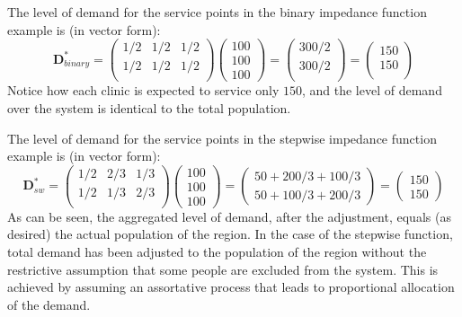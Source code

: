\documentclass[10pt,letterpaper]{article}
\begin{document}
The level of demand for the service points in the binary impedance
function example is (in vector form): \[
\mathbf{D}^*_{binary}= \left( \begin{array}{ccc}
1/2 & 1/2 & 1/2\\
1/2 & 1/2 & 1/2\\
\end{array} \right)
\left( \begin{array}{c}
100\\
100\\
100
\end{array} \right)=
\left( \begin{array}{c}
300/2\\
300/2\\
\end{array} \right)=
\left( \begin{array}{c}
150\\
150\\
\end{array} \right)
\] Notice how each clinic is expected to service only \(150\), and the
level of demand over the system is identical to the total population.

The level of demand for the service points in the stepwise impedance
function example is (in vector form): \[
\mathbf{D}^*_{sw}= \left( \begin{array}{ccc}
1/2 & 2/3 & 1/3\\
1/2 & 1/3 & 2/3\\
\end{array} \right)
\left( \begin{array}{c}
100\\
100\\
100
\end{array} \right)=
\left( \begin{array}{c}
50 + 200/3 + 100/3\\
50 + 100/3 + 200/3
\end{array} \right)=
\left( \begin{array}{c}
150\\
150
\end{array} \right)
\] As can be seen, the aggregated level of demand, after the adjustment,
equals (as desired) the actual population of the region. In the case of
the stepwise function, total demand has been adjusted to the population
of the region without the restrictive assumption that some people are
excluded from the system. This is achieved by assuming an assortative
process that leads to proportional allocation of the demand.
\end{document}
